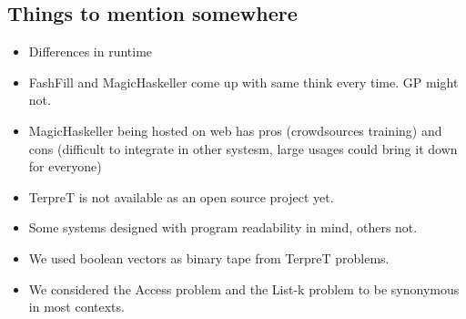 \subsection{Things to mention somewhere}
\begin{itemize}
 \item Differences in runtime
 \item FashFill and MagicHaskeller come up with same think every time. GP might not.
 \item MagicHaskeller being hosted on web has pros (crowdsources training) and cons (difficult to integrate in other systesm, large usages could bring it down for everyone)
 \item TerpreT is not available as an open source project yet.
 \item Some systems designed with program readability in mind, others not.
 \item We used boolean vectors as binary tape from TerpreT problems.
 \item We considered the Access problem and the List-k problem to be synonymous in most contexts.
\end{itemize}